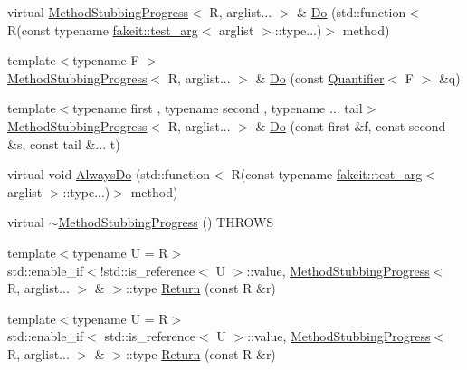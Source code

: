 \begin{DoxyCompactItemize}
virtual \mbox{\hyperlink{structfakeit_1_1MethodStubbingProgress}{Method\+Stubbing\+Progress}}$<$ R, arglist... $>$ \& \mbox{\hyperlink{structfakeit_1_1MethodStubbingProgress_a9ef4c2db8e567aa312b708613d240ae1}{Do}} (std\+::function$<$ R(const typename \mbox{\hyperlink{structfakeit_1_1test__arg}{fakeit\+::test\+\_\+arg}}$<$ arglist $>$\+::type...)$>$ method)
\item 
{\footnotesize template$<$typename F $>$ }\\\mbox{\hyperlink{structfakeit_1_1MethodStubbingProgress}{Method\+Stubbing\+Progress}}$<$ R, arglist... $>$ \& \mbox{\hyperlink{structfakeit_1_1MethodStubbingProgress_a59f9d7ab7c86b809ce25b41d05b58ad2}{Do}} (const \mbox{\hyperlink{structfakeit_1_1Quantifier}{Quantifier}}$<$ F $>$ \&q)
\item 
{\footnotesize template$<$typename first , typename second , typename ... tail$>$ }\\\mbox{\hyperlink{structfakeit_1_1MethodStubbingProgress}{Method\+Stubbing\+Progress}}$<$ R, arglist... $>$ \& \mbox{\hyperlink{structfakeit_1_1MethodStubbingProgress_a157561400e37da65c5b48f4466fc603c}{Do}} (const first \&f, const second \&s, const tail \&... t)
\item 
virtual void \mbox{\hyperlink{structfakeit_1_1MethodStubbingProgress_a47464ab35cb06c00dbd00a13328b80a7}{Always\+Do}} (std\+::function$<$ R(const typename \mbox{\hyperlink{structfakeit_1_1test__arg}{fakeit\+::test\+\_\+arg}}$<$ arglist $>$\+::type...)$>$ method)
\item 
virtual \mbox{\hyperlink{structfakeit_1_1MethodStubbingProgress_aed2c96ce537706935976943354c49616}{$\sim$\+Method\+Stubbing\+Progress}} () T\+H\+R\+O\+WS
\item 
{\footnotesize template$<$typename U  = R$>$ }\\std\+::enable\+\_\+if$<$!std\+::is\+\_\+reference$<$ U $>$\+::value, \mbox{\hyperlink{structfakeit_1_1MethodStubbingProgress}{Method\+Stubbing\+Progress}}$<$ R, arglist... $>$ \& $>$\+::type \mbox{\hyperlink{structfakeit_1_1MethodStubbingProgress_ab97be63c322887db40cb788d28875fea}{Return}} (const R \&r)
\item 
{\footnotesize template$<$typename U  = R$>$ }\\std\+::enable\+\_\+if$<$ std\+::is\+\_\+reference$<$ U $>$\+::value, \mbox{\hyperlink{structfakeit_1_1MethodStubbingProgress}{Method\+Stubbing\+Progress}}$<$ R, arglist... $>$ \& $>$\+::type \mbox{\hyperlink{structfakeit_1_1MethodStubbingProgress_ab20141c6f552c3aa3399660c520c2ba4}{Return}} (const R \&r)
\item 

\end{DoxyCompactItemize}
